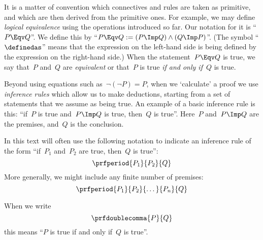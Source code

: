 It is a matter of convention which connectives and rules are taken as primitive, and which are then derived from the primitive ones.
For example, we may define \emph{logical equivalence} using the operations introduced so far.
Our notation for it is ``$P \Eqv Q$''.
We define this by ``$P \Eqv Q := (P \Imp Q) \wedge (Q \Imp P)$''.
(The symbol ``$\definedas$'' means that the expression on the left-hand side is being defined by the expression on the right-hand side.)
When the statement~$P \Eqv Q$ is true, we say that~$P$ and~$Q$ are \emph{equivalent} or that~$P$ is true \emph{if and only if}~$Q$ is true.

Beyond using equations such as~$\lnot (\lnot P) = P$, when we `calculate' a proof we use \emph{inference rules} which allow us to make deductions, starting from a set of statements that we assume as being true.
An example of a basic inference rule is this: ``if~$P$ is true and~$P \Imp Q$ is true, then~$Q$ is true''.
Here~$P$ and~$P \Imp Q$ are the premises, and~$Q$ is the conclusion.

In this text will often use the following notation to indicate an inference rule of the form ``if~$P_1$ and~$P_2$ are true, then~$Q$ is true'':
\begin{equation*}
    \prfperiod{
        P_1}{P_2}{Q}
\end{equation*}
More generally, we might include any finite number of premises:
\begin{equation*}
    \prfperiod{
        P_1}{P_2}{\dots}{P_n}{Q}
\end{equation*}

When we write
\begin{equation*}
    \prfdoublecomma{
        P
    }{
        Q
    }
\end{equation*}
this means ``$P$ is true if and only if~$Q$ is true''.
